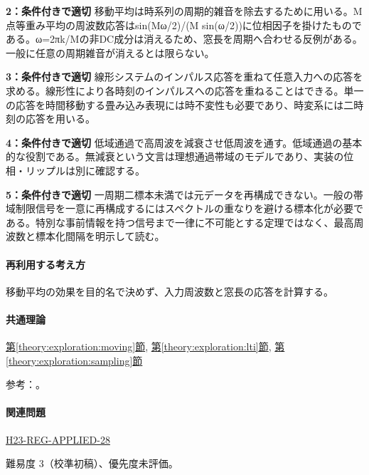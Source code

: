 \noindent\textbf{2：条件付きで適切} 移動平均は時系列の周期的雑音を除去するために用いる。M点等重み平均の周波数応答はsin(Mω/2)/(M sin(ω/2))に位相因子を掛けたものである。ω=2πk/Mの非DC成分は消えるため、窓長を周期へ合わせる反例がある。一般に任意の周期雑音が消えるとは限らない。\par

\noindent\textbf{3：条件付きで適切} 線形システムのインパルス応答を重ねて任意入力への応答を求める。線形性により各時刻のインパルスへの応答を重ねることはできる。単一の応答を時間移動する畳み込み表現には時不変性も必要であり、時変系には二時刻の応答を用いる。\par

\noindent\textbf{4：条件付きで適切} 低域通過で高周波を減衰させ低周波を通す。低域通過の基本的な役割である。無減衰という文言は理想通過帯域のモデルであり、実装の位相・リップルは別に確認する。\par

\noindent\textbf{5：条件付きで適切} 一周期二標本未満では元データを再構成できない。一般の帯域制限信号を一意に再構成するにはスペクトルの重なりを避ける標本化が必要である。特別な事前情報を持つ信号まで一律に不可能とする定理ではなく、最高周波数と標本化間隔を明示して読む。\par

\paragraph{再利用する考え方} 移動平均の効果を目的名で決めず、入力周波数と窓長の応答を計算する。

\paragraph{共通理論} \hyperref[theory:exploration:moving]{第\ref*{theory:exploration:moving}節}, \hyperref[theory:exploration:lti]{第\ref*{theory:exploration:lti}節}, \hyperref[theory:exploration:sampling]{第\ref*{theory:exploration:sampling}節}

\par 参考：\cite{mit_signals2010,mit_moving2012,scipy_notch,scipy_fft,usgs_processing2000}。

\paragraph{関連問題} \hyperref[q:h23-reg-applied-28]{H23-REG-APPLIED-28}

\par 難易度 3（校準初稿）、優先度未評価。

